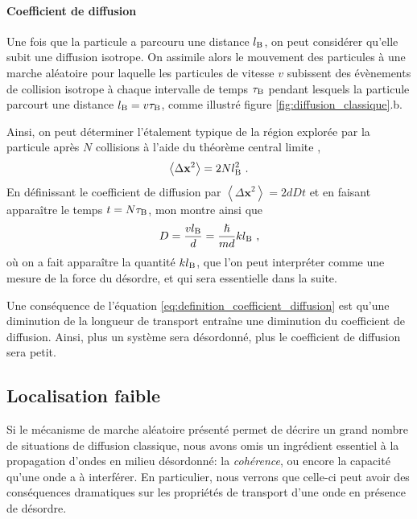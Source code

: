 \paragraph*{Coefficient de diffusion}
Une fois que la particule a parcouru une distance $l_{\mathrm{B}}$, on peut considérer qu'elle subit une diffusion isotrope. On assimile alors le mouvement des particules à une marche aléatoire pour laquelle les particules de vitesse $v$ subissent des évènements de collision isotrope à chaque intervalle de temps $\tau_{\mathrm{B}}$ pendant lesquels la particule parcourt une distance $l_{\mathrm{B}}=v \tau_{\mathrm{B}}$, comme illustré figure \ref{fig:diffusion_classique}.b.

Ainsi, on peut déterminer l'étalement typique de la région explorée par la particule après $N$ collisions à l'aide du théorème central limite \citep{diu1989elements},
\begin{equation}
\left\langle \Delta \mathbf{x}^2 \right\rangle=2 N l_{\mathrm{B}}^2 \text{ .}
\end{equation}
En définissant le coefficient de diffusion par $ \left\langle \Delta \mathbf{x}^2 \right\rangle = 2 d D t$ et en faisant apparaître le temps $t=N \tau_{\mathrm{B}}$, mon montre ainsi que 
\begin{equation}
D=\frac{v l_{\mathrm{B}}}{d}=\frac{\hslash}{m d} k l_{\mathrm{B}} \text{ ,}
\label{eq:definition_coefficient_diffusion}
\end{equation}
où on a fait apparaître la quantité $k l_{\mathrm{B}}$, que l'on peut interpréter comme une mesure de la force du désordre, et qui sera essentielle dans la suite.

Une conséquence de l'équation \ref{eq:definition_coefficient_diffusion} est qu'une diminution de la longueur de transport entraîne une diminution du coefficient de diffusion. Ainsi, plus un système sera désordonné, plus le coefficient de diffusion sera petit.














\subsection{Localisation faible}
\label{sc:weak_localisation}
Si le mécanisme de marche aléatoire présenté permet de décrire un grand nombre de situations de diffusion classique, nous avons omis un ingrédient essentiel à la propagation d'ondes en milieu désordonné: la \emph{cohérence}, ou encore la capacité qu'une onde a à interférer. En particulier, nous verrons que celle-ci peut avoir des conséquences dramatiques sur les propriétés de transport d'une onde en présence de désordre.

